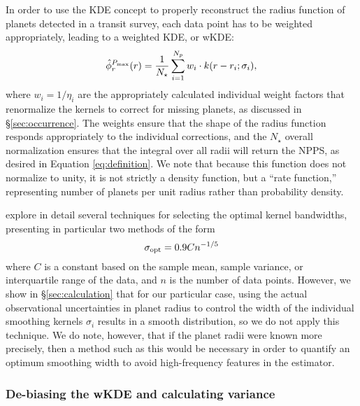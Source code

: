 \documentclass[iop]{emulateapj}
\begin{document}
In order to use the KDE concept to properly reconstruct the radius function of planets detected in a transit survey, each data point has to be weighted appropriately, leading to a weighted KDE, or wKDE:
\begin{equation}
\label{eq:wkde}
\hat\phi^{P_{\rm max}}_r(r) = \frac{1}{N_\star} \sum_{i=1}^{N_p}  w_i \cdot k(r-r_i;\sigma_i),
\end{equation}
where $w_i = 1/\eta_i$ are the appropriately calculated individual weight factors that renormalize the kernels to correct for missing planets, as discussed in \S\ref{sec:occurrence}.  The weights ensure that the shape of the radius function responds appropriately to the individual corrections, and the $N_\star$ overall normalization ensures that the integral over all radii will return the NPPS, as desired in Equation \ref{eq:definition}.  We note that because this function does not normalize to unity, it is not strictly a density function, but a ``rate function,'' representing number of planets per unit radius rather than probability density.  

\citet{wang2007} explore in detail several techniques for selecting the optimal kernel bandwidths, presenting in particular two methods of the form 
\begin{equation}
\label{eq:wangh}
\sigma_{\rm opt} = 0.9 C n^{-1/5}
\end{equation}
where $C$ is a constant based on the sample mean, sample variance, or interquartile range of the data, and $n$ is the number of data points.  However, we show in \S\ref{sec:calculation} that for our particular case, using the actual observational uncertainties in planet radius to control the width of the individual smoothing kernels $\sigma_i$ results in a smooth distribution, so we do not apply this technique.  We do note, however, that if the planet radii were known more precisely, then a method such as this would be necessary in order to quantify an optimum smoothing width to avoid high-frequency features in the estimator.


\subsubsection{De-biasing the wKDE and calculating variance}
\label{sec:biasvariance}
\end{document}
